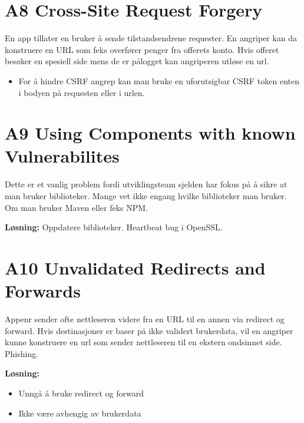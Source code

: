 \documentclass{article}
\begin{document}
\begin{flushleft}
        \section{A8 Cross-Site Request Forgery}
        En app tillater en bruker å sende tilstandsendrene requester. 
        En angriper kan da konstruere en URL som feks overfører penger fra offerets konto. 
        Hvis offeret besøker en spesiell side mens de er pålogget kan angriperen utløse en url.

        \begin{itemize}
            \item For å hindre CSRF angrep kan man bruke en uforutsigbar CSRF token enten i bodyen på requesten eller i urlen. 
        \end{itemize}

        \section{A9 Using Components with known Vulnerabilites}
        Dette er et vanlig problem fordi utviklingsteam sjelden har fokus på å sikre at man bruker biblioteker. 
        Mange vet ikke engang hvilke biblioteker man bruker. Om man bruker Maven eller feks NPM. \par 
        \textbf{Løsning:}
        Oppdatere biblioteker. Heartbeat bug i OpenSSL.


        \section{A10 Unvalidated Redirects and Forwards}
        Appenr sender ofte nettleseren videre fra en URL til en annen via redirect og forward. 
        Hvis destinasjoner er baser på ikke validert brukerdata, vil en angriper kunne konstruere en url som sender nettleseren til en ekstern ondsinnet side.
        Phishing.\par 

        \textbf{Løsning:}
        \begin{itemize}
            \item Unngå å bruke redirect og forward
            \item Ikke være avhengig av brukerdata
        \end{itemize}

    \end{flushleft}
\end{document}
